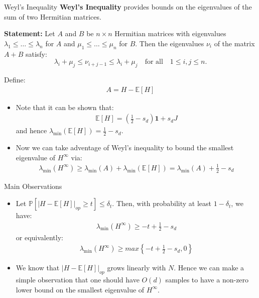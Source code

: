 \documentclass[serif, aspectratio=169]{beamer}
\begin{document}
\begin{frame}{Weyl's Inequality}
    \textbf{Weyl's Inequality} provides bounds on the eigenvalues of the sum of two Hermitian matrices.

    \vspace{0.5cm}
    
    \textbf{Statement:} Let \( A \) and \( B \) be \( n \times n \) Hermitian matrices with eigenvalues \( \lambda_1 \leq \dots \leq \lambda_n \) for \( A \) and \( \mu_1 \leq \dots \leq \mu_n \) for \( B \). Then the eigenvalues \( \nu_i \) of the matrix \( A + B \) satisfy:
    \[
    \lambda_i + \mu_j \leq \nu_{i+j-1} \leq \lambda_i + \mu_j \quad \text{for all} \quad 1 \leq i,j \leq n.
    \]
\end{frame}

\begin{frame}
	Define:
	\begin{align*}
		A = H - \mathbb{E}[H] 
	\end{align*}
	\begin{itemize}
		\item Note that it can be shown that:
		\begin{align*}
			\mathbb{E}[H] = (\frac{1}{2} -s_d) \mathbf{1} + s_d J
		\end{align*}
		and hence \( \lambda_{\min}(\mathbb{E}[H]) = \frac{1}{2} - s_d \).
		\item Now we can take adventage of Weyl's inequality to bound the smallest eigenvalue of \(H^\infty\) via:
			\begin{align*}
				\lambda_{\min}(H^\infty) \geq \lambda_{\min}(A) + \lambda_{\min}(\mathbb{E}[H]) = \lambda_{\min}(A) + \frac{1}{2} - s_d
			\end{align*}
	\end{itemize}
\end{frame}

\begin{frame}{Main Observations}
	\begin{itemize}
		\item 	Let \( \mathbb{P} \left[ \lvert H - \mathbb{E}[H] \rvert_{op} \geq t \right] \leq \delta_t \). Then, with probability at least \( 1 - \delta_t \), we have:
		\begin{align*}
			\lambda_{\min}(H^\infty) \geq -t + \frac{1}{2} - s_d
		\end{align*}
		or equivalently:
		\begin{align*}
			\lambda_{\min}(H^\infty) \geq max \left\{ -t + \frac{1}{2} - s_d, 0 \right\}
		\end{align*}
		\item We know that \( \lvert H - \mathbb{E}[H] \rvert_{op} \) grows linearly with \( N \). Hence we can make a simple observation that one should have $O(d)$ samples to have a non-zero lower bound on the smallest eigenvalue of \(H^\infty\).
	\end{itemize}


	
\end{frame}
\end{document}
